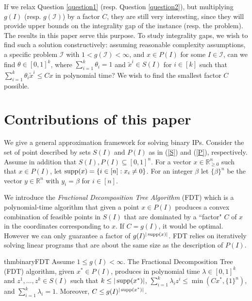 If we relax Question \ref{question1} (resp. Question \ref{question2}), but multiplying $g(I)$ (resp. $g(\mathcal{I})$) by a factor $C$, they are still very interesting, since they will provide upper bounds on the integrality gap of the instance (resp. the problem). The results in this paper serve this purpose.
\fi
To study integrality gaps, we wish to find such a solution constructively: assuming reasonable complexity assumptions, a specific problem $\mathcal{I}$ with  $1<g(\mathcal{I})<\infty$, and $x\in P(I)$ for some $I\in \mathcal{I}$, can we find $\theta \in [0,1]^k$, where $\sum_{i=1}^{k}\theta_i =1$ and $\tilde{x}^i\in S(I)$ for $i\in [k]$ such that $\sum_{i=1}^{k}\theta_i \tilde{x}^i\leq Cx$ in polynomial time? We wish to find the smallest factor $C$ possible.

\section{Contributions of this paper} 
 
We give a general approximation framework for solving binary IPs.  Consider the set of point described by sets $S(I)$ and $P(I)$ as in (\ref{S}) and (\ref{P}), respectively. Assume in addition that $S(I),P(I)\subseteq [0,1]^n$.  For a vector $x\in \mathbb{R}_{\geq 0}^n$ such that $x\in P(I)$, let $\operatorname{supp}(x)= \{i \in [n]: x_i \neq 0\}$. For an integer $\beta$ let $\{\beta\}^n$ be the vector $y\in \mathbb{R}^n$ with $y_i=\beta$ for $i\in [n]$.


We introduce the \textit{Fractional Decomposition Tree Algorithm} (FDT) which is a polynomial-time algorithm that given a point $x\in P(I)$ produces a convex combination of feasible points in $S(I)$ that are dominated by a ``factor" $C$ of $x$ in the coordinates corresponding to $x$. If $C = g(I)$, it would be optimal. However we can only guarantee a factor of $g(I)^{|\operatorname{supp}(x)|}$. FDT relies on iteratively solving linear programs that are about the same size as the description of $P(I)$.

\begin{restatable}{thm}{binaryFDT}
	\label{binaryFDT}
	Assume $1\leq g(I) 	<\infty$. 	
	The Fractional Decomposition Tree (FDT) algorithm, given $x^*\in P(I)$, produces in polynomial time $\lambda\in [0,1]^k$ and $z^1,\ldots,z^k \in S(I)$ such that $k\leq |\operatorname{supp}(x^*)|$, $\sum_{i=1}^{k}\lambda_i z^i\leq \min(Cx^*,\{1\}^{n})$, and $\sum_{i=1}^{k}\lambda_i = 1$. Moreover, $C\leq g(I)^{|\operatorname{supp}(x^*)|}$.
\end{restatable}

